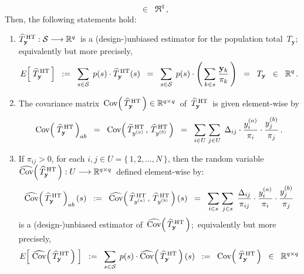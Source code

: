 \begin{proposition}
\begin{equation*}
	\;\; \in \;\;
	\Re^{q}\,,
\end{equation*}
Then, the following statements hold:
\begin{enumerate}
\item
	$\widehat{T}^{\,\textnormal{HT}}_{\mathbf{y}} : \mathcal{S} \longrightarrow \Re^{q}$\,
	is a (design-)unbiased estimator for the population total \,$T_{\mathbf{y}}$;\,
	equivalently but more precisely,
	\begin{equation*}
	E\!\left[\;\widehat{T}^{\,\textnormal{HT}}_{\mathbf{y}}\,\right]
	\;\; := \;\;
		\underset{s \in \mathcal{S}}{\sum}\;\,
		p(s) \cdot \widehat{T}^{\,\textnormal{HT}}_{\mathbf{y}}(s)
	\;\; = \;\;
		\underset{s \in \mathcal{S}}{\sum}\;\,
		p(s) \cdot \left(\,\underset{k \in s}{\sum}\;\dfrac{\mathbf{y}_{k}}{\pi_{k}}\,\right)
	\;\; = \;\;
		T_{\mathbf{y}}
	\;\; \in \;\;
		\Re^{q}\,.
	\end{equation*}
\item
	The covariance matrix
	\,$\Cov\!\left(\,\widehat{T}^{\,\textnormal{HT}}_{\mathbf{y}}\,\right) \in \Re^{q \times q}$\,
	of \,$\widehat{T}^{\,\textnormal{HT}}_{\mathbf{y}}$\, is given element-wise by
	\begin{equation*}
	\Cov\!\left(\;\widehat{T}^{\,\textnormal{HT}}_{\mathbf{y}}\,\right)_{ab}
	\;\; = \;\;
		\Cov\!\left(\,\widehat{T}^{\,\textnormal{HT}}_{y^{(a)}}\,,\,\widehat{T}^{\,\textnormal{HT}}_{y^{(b)}}\,\right)
	\;\; = \;\;
		\underset{i \in U}{\sum} \; \underset{j \in U}{\sum}\;\,
		\Delta_{ij} \cdot \dfrac{y^{(a)}_{i}}{\pi_{i}} \cdot \dfrac{y^{(b)}_{j}}{\pi_{j}}\,.
	\end{equation*}
\item
	If $\pi_{ij} > 0$, for each $i , j \in U = \{\,1,2,\ldots,N\,\}$, then the random variable
	\,$\widehat{\Cov}\!\left(\,\widehat{T}^{\,\textnormal{HT}}_{\mathbf{y}}\,\right) : U \longrightarrow \Re^{q \times q}$\,
	defined element-wise by:
	\begin{equation*}
	\widehat{\Cov}\!\left(\,\widehat{T}^{\,\textnormal{HT}}_{\mathbf{y}}\,\right)_{ab}(s)
	\;\; := \;\;
		\widehat{\Cov}\!\left(\,\widehat{T}^{\,\textnormal{HT}}_{y^{(a)}}\,,\,\widehat{T}^{\,\textnormal{HT}}_{y^{(b)}}\,\right)(s)
	\;\; = \;\;
		\underset{i \in s}{\sum} \; \underset{j \in s}{\sum}\;\,
		\dfrac{\Delta_{ij}}{\pi_{ij}} \cdot \dfrac{y^{(a)}_{i}}{\pi_{i}} \cdot \dfrac{y^{(b)}_{j}}{\pi_{j}}
	\end{equation*}
	is a (design-)unbiased estimator of \,$\widehat{\Cov}\!\left(\,\widehat{T}^{\,\textnormal{HT}}_{\mathbf{y}}\,\right)$;\,
	equivalently but more precisely,
	\begin{equation*}
	E\!\left[\; \widehat{\Cov}\!\left(\,\widehat{T}^{\,\textnormal{HT}}_{\mathbf{y}}\,\right) \;\right]
	\;\; := \;\;
		\underset{s\in\mathcal{S}}{\sum}\;\,
		p(s) \cdot \widehat{\Cov}\!\left(\,\widehat{T}^{\,\textnormal{HT}}_{\mathbf{y}}\,\right)(s)
	\;\; := \;\;
		\Cov\!\left(\;\widehat{T}^{\,\textnormal{HT}}_{\mathbf{y}}\,\right)
	\;\; \in \;\;
		\Re^{q \times q}
	\end{equation*}
\end{enumerate}
\end{proposition}

